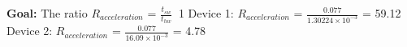 \textbf{Goal:} The ratio $R_{acceleration}$ = $\frac{t_{sw}}{t_{hw}} \>$ 1\newline \newline
Device 1: $R_{acceleration}$ = $\frac{0.077}{1.30224 \times 10^{-3}}$ = 59.12\newline \newline
Device 2: $R_{acceleration}$ = $\frac{0.077}{16.09 \times 10^{-3}}$ = 4.78